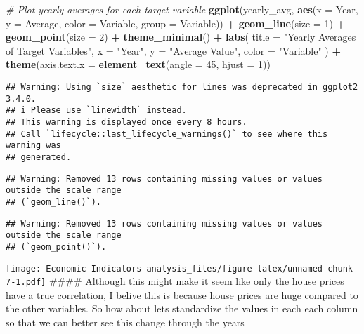 \documentclass[
]{article}
\newenvironment{Shaded}{\begin{snugshade}}{\end{snugshade}}
\newcommand{\AttributeTok}[1]{\textcolor[rgb]{0.13,0.29,0.53}{#1}}
\newcommand{\CommentTok}[1]{\textcolor[rgb]{0.56,0.35,0.01}{\textit{#1}}}
\newcommand{\DecValTok}[1]{\textcolor[rgb]{0.00,0.00,0.81}{#1}}
\newcommand{\FunctionTok}[1]{\textcolor[rgb]{0.13,0.29,0.53}{\textbf{#1}}}
\newcommand{\NormalTok}[1]{#1}
\newcommand{\SpecialCharTok}[1]{\textcolor[rgb]{0.81,0.36,0.00}{\textbf{#1}}}
\newcommand{\StringTok}[1]{\textcolor[rgb]{0.31,0.60,0.02}{#1}}
\begin{document}
\begin{Shaded}
\begin{Highlighting}[]
\CommentTok{\# Plot yearly averages for each target variable}
\FunctionTok{ggplot}\NormalTok{(yearly\_avg, }\FunctionTok{aes}\NormalTok{(}\AttributeTok{x =}\NormalTok{ Year, }\AttributeTok{y =}\NormalTok{ Average, }\AttributeTok{color =}\NormalTok{ Variable, }\AttributeTok{group =}\NormalTok{ Variable)) }\SpecialCharTok{+}
  \FunctionTok{geom\_line}\NormalTok{(}\AttributeTok{size =} \DecValTok{1}\NormalTok{) }\SpecialCharTok{+}
  \FunctionTok{geom\_point}\NormalTok{(}\AttributeTok{size =} \DecValTok{2}\NormalTok{) }\SpecialCharTok{+}
  \FunctionTok{theme\_minimal}\NormalTok{() }\SpecialCharTok{+}
  \FunctionTok{labs}\NormalTok{(}
    \AttributeTok{title =} \StringTok{"Yearly Averages of Target Variables"}\NormalTok{,}
    \AttributeTok{x =} \StringTok{"Year"}\NormalTok{,}
    \AttributeTok{y =} \StringTok{"Average Value"}\NormalTok{,}
    \AttributeTok{color =} \StringTok{"Variable"}
\NormalTok{  ) }\SpecialCharTok{+}
  \FunctionTok{theme}\NormalTok{(}\AttributeTok{axis.text.x =} \FunctionTok{element\_text}\NormalTok{(}\AttributeTok{angle =} \DecValTok{45}\NormalTok{, }\AttributeTok{hjust =} \DecValTok{1}\NormalTok{))}
\end{Highlighting}
\end{Shaded}

\begin{verbatim}
## Warning: Using `size` aesthetic for lines was deprecated in ggplot2 3.4.0.
## i Please use `linewidth` instead.
## This warning is displayed once every 8 hours.
## Call `lifecycle::last_lifecycle_warnings()` to see where this warning was
## generated.
\end{verbatim}

\begin{verbatim}
## Warning: Removed 13 rows containing missing values or values outside the scale range
## (`geom_line()`).
\end{verbatim}

\begin{verbatim}
## Warning: Removed 13 rows containing missing values or values outside the scale range
## (`geom_point()`).
\end{verbatim}

\texttt{[image: Economic-Indicators-analysis\_files/figure-latex/unnamed-chunk-7-1.pdf]}
\#\#\#\# Although this might make it seem like only the house prices
have a true correlation, I belive this is because house prices are huge
compared to the other variables. So how about lets standardize the
values in each each column so that we can better see this change through
the years
\end{document}
